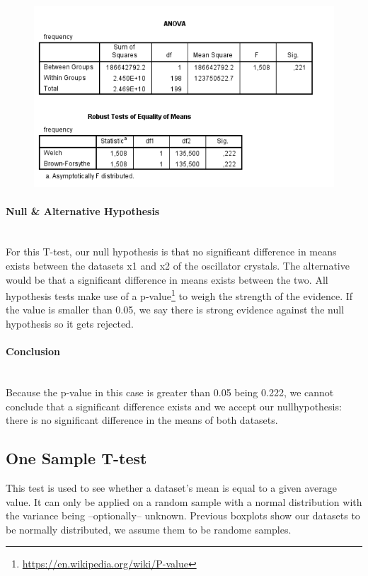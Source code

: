 \documentclass[14]{article}
\begin{document}
\begin{figure}[!htb]
	\includegraphics[width=1.0\textwidth]{img/question1/question1_b.PNG}
	\captionsetup{width=1.0\textwidth}
	\centering
\end{figure}

\paragraph{Null \& Alternative Hypothesis}\mbox{}\\
For this T-test, our null hypothesis is that no significant difference in means exists between the datasets x1 and x2 of the oscillator crystals. The alternative would be that a significant difference in means exists between the two. All hypothesis tests make use of a p-value\footnote{\protect\url{https://en.wikipedia.org/wiki/P-value}} to weigh the strength of the evidence. If the value is smaller than 0.05, we say there is strong evidence against the null hypothesis so it gets rejected.

\paragraph{Conclusion}\mbox{}\\
Because the p-value in this case is greater than 0.05 being 0.222, we cannot conclude that a significant difference exists and we accept our nullhypothesis: there is no significant difference in the means of both datasets.


\subsection{One Sample T-test}
This test is used to see whether a dataset's mean is equal to a given average value. It can only be applied on a random sample with a normal distribution with the variance being --optionally-- unknown. Previous boxplots show our datasets to be normally distributed, we assume them to be randome samples.
\end{document}

